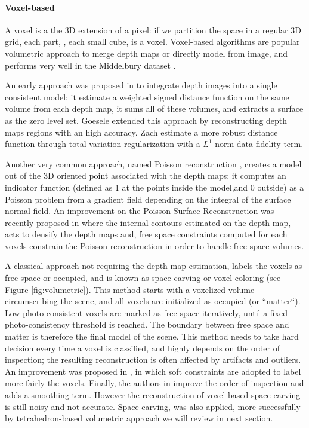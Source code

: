 \paragraph{Voxel-based}
A voxel is a the 3D extension of a pixel: if we partition the space in a regular 3D grid, each part, \ie, each small cube, is a voxel.
Voxel-based  algorithms are popular volumetric approach to merge depth maps or directly model from image, and performs very well in the Middelbury dataset \cite{seitz_et_al06}.

An early approach was proposed in \cite{curless1996volumetric} to integrate depth images into a single consistent model: it estimate a weighted signed distance function on the same volume from each depth map, it sums all of these volumes, and extracts a surface as the zero level set.
Goesele \etal \cite{goesele2006multi} extended this approach by reconstructing depth maps regions with an high accuracy.
Zach \etal \cite{zach2007globally} estimate a more robust distance function through total variation regularization with a $L^1$ norm data fidelity term.

Another very common approach, named  Poisson reconstruction \cite{kazhdan2006poisson}, creates a model out of the 3D oriented point associated with the depth maps: it computes an indicator function (defined as 1 at the points inside the model,and 0  outside) as a Poisson problem from a gradient field depending on the integral of the surface normal field.
An improvement on the Poisson Surface Reconstruction was recently proposed in \cite{shan2014occluding} where the internal contours estimated on the depth map, acts to densify the depth maps and, free space constraints computed for each voxels constrain the Poisson reconstruction in order to handle free space volumes.

A classical approach not requiring the depth map estimation, labels the voxels as free space or occupied, and is known as space carving or voxel coloring \cite{seitz1999photorealistic,kutulakos_seitz05} (see Figure \ref{fig:volumetric}). 
This method starts with a voxelized volume circumscribing the scene, and all voxels are initialized as occupied (or ``matter``). 
Low photo-consistent voxels are marked as free space iteratively, until a fixed photo-consistency threshold is reached. The boundary between free space and matter is therefore the final model of the scene. 
This method needs to take hard decision every time a voxel is classified, and highly depends on the order of inspection; the resulting reconstruction is often affected by artifacts and outliers.
An improvement was proposed in \cite{broadhurst2001probabilistic}, in which soft constraints are adopted to label more fairly the voxels.
Finally, the authors in \cite{yang2003multi} improve the order of inspection and adds a smoothing term. 
However the reconstruction of voxel-based space carving is still noisy and not  accurate.
Space carving, was also applied, more successfully by tetrahedron-based volumetric approach we will  review in next section.

